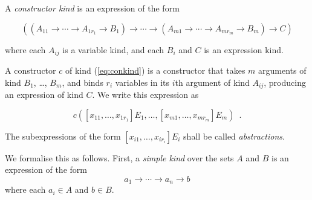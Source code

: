 \begin{code}%
\>[0]\<[2]%
\>[2] \AgdaSymbol{=}  \<%
\end{code}

A \emph{constructor kind} is an expression of the form

\[ ((A_{11} \rightarrow \cdots \rightarrow A_{1r_1} \rightarrow B_1) \rightarrow \cdots \rightarrow (A_{m1} \rightarrow \cdots \rightarrow A_{mr_m} \rightarrow B_m) \rightarrow C) \]

where each $A_{ij}$ is a variable kind, and each $B_i$ and $C$ is an expression kind.

A constructor $c$ of kind (\ref{eq:conkind}) is a constructor that takes $m$ arguments of kind $B_1$, \ldots, $B_m$, and binds $r_i$ variables in its $i$th argument of kind $A_{ij}$,
producing an expression of kind $C$.  We write this expression as

\begin{equation}
\label{eq:expression}
c([x_{11}, \ldots, x_{1r_1}]E_1, \ldots, [x_{m1}, \ldots, x_{mr_m}]E_m) \enspace .
\end{equation}

The subexpressions of the form $[x_{i1}, \ldots, x_{ir_i}]E_i$ shall be called \emph{abstractions}.

We formalise this as follows.  First, a \emph{simple kind} over the sets $A$ and $B$ is an expression of the form
\[ a_1 \longrightarrow \cdots \longrightarrow a_n \longrightarrow b \]
where each $a_i \in A$ and $b \in B$.


